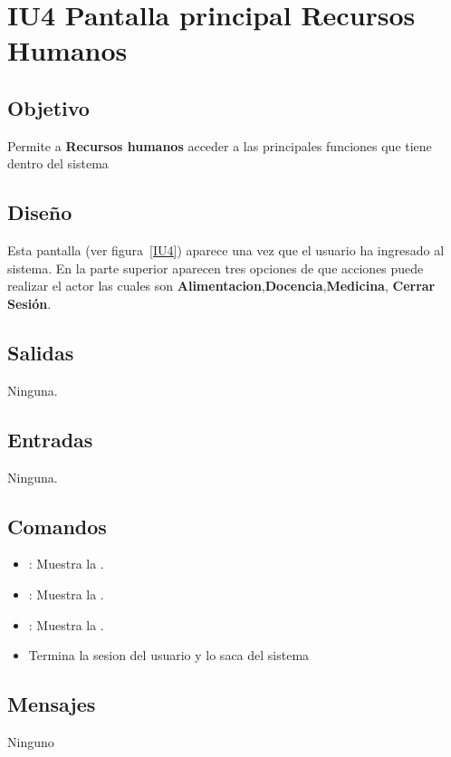 \newpage
\newpage
\section{IU4 Pantalla principal Recursos Humanos}

\subsection{Objetivo}
	Permite a {\bf Recursos humanos} acceder a las principales funciones que tiene dentro del sistema

\subsection{Diseño}
	Esta pantalla  (ver figura~\ref{IU4}) aparece una vez que el usuario ha ingresado al sistema. En la parte superior aparecen tres opciones de que acciones puede realizar el actor las cuales son {\bf Alimentacion},{\bf Docencia},{\bf Medicina}, {\bf Cerrar Sesión}.

 

\subsection{Salidas}

	Ninguna.

\subsection{Entradas}

Ninguna.

\subsection{Comandos}
\begin{itemize}
	\item {}: Muestra la .
	\item {}: Muestra la .
 	\item {}: Muestra la .
          \item {}Termina la sesion del usuario y lo saca del sistema
\end{itemize}

\subsection{Mensajes}

\begin{Citemize}
	\item Ninguno
\end{Citemize}

